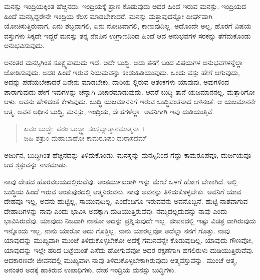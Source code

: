 ಮನಸ್ಸು ಇಂದ್ರಿಯಕ್ಕಿಂತ ಹೆಚ್ಚಿನದು. ಇಂದ್ರಿಯಕ್ಕೆ ಪ್ರಾಣ ಕೊಡುವುದು ಅದರ ಹಿಂದೆ ಇರುವ ಮನಸ್ಸು. ಇಂದ್ರಿಯದ ಹಿಂದೆ ಮನಸ್ಸಿದ್ದರೇನೇ ಇಂದ್ರಿಯ ಕೆಲಸ ಮಾಡಬೇಕಾದರೆ. ಮನಸ್ಸು ಮತ್ತಾವುದನ್ನೋ ದೀರ್ಘವಾಗಿ ಯೋಚಿಸುತ್ತಿರುವಾಗ, ಏನು ಶಬ್ದವಾಗಲಿ, ಏನು ನೋಟವಾಗಲಿ, ಕಾಣುವುದಿಲ್ಲ. ಅದೊಂದೇ ಅಲ್ಲ. ಹೊರಗೆ ವಿಷಯ ವಸ್ತುಗಳು ಸಿಕ್ಕದೇ ಇದ್ದರೆ ಮನಸ್ಸು ತನ್ನ ನೆನಪಿನ ಉಗ್ರಾಣದಿಂದ ಹಿಂದೆ ಆದ ಅನುಭವಗಳ ಸರಕನ್ನು ತೆಗೆದುಕೊಂಡು ಅನುಭವಿಸುವುದು.

ಅನಂತರ ಮನಸ್ಸಿಗಿಂತ ಸೂಕ್ಷ್ಮವಾದುದು ಇದೆ. ಅದೇ ಬುದ್ಧಿ. ಅದು ತನಗೆ ಬಂದ ವಿಷಯಗಳ ಅನುಭವಗಳನ್ನೆಲ್ಲಾ ಜೋಡಿಸುವುದು. ಅದರ ಹಿಂದೆ ಇರುವ ನಿಯಮವನ್ನು ಕಂಡುಹಿಡಿಯುವುದು. ಒಂದು ವಸ್ತು ಹೇಗೆ ಆಗುವುದು, ಅದನ್ನು ಪಡೆಯಬೇಕಾದರೆ ಏನೇನು ಮಾಡಬೇಕು, ದಾರಿಯ ಲ್ಲಿರುವ ಆತಂಕಗಳು ಯಾವುವು, ಅವುಗಳಿಂದ ಪಾರಾಗುವುದು ಹೇಗೆ ಇವುಗಳನ್ನು ಚೆನ್ನಾಗಿ ವಿಚಾರಮಾಡುವುದು. ಆದರೆ ಬುದ್ಧಿ ತಾನೆ ಯಜಮಾನನಲ್ಲ. ಮತ್ತಾರಿಗೋ ಆಳು. ಅವನು ಹೇಳಿದಂತೆ ಕೇಳುವುದು. ಬುದ್ಧಿ ಯಜಮಾನನಿಗೆ ಇರುವ ಬುದ್ಧಿವಂತನಾದ ಆಳಿನಂತೆ. ಆ ಯಜಮಾನನೇ ಆತ್ಮ. ಅವನ ಅಧೀನ ಬುದ್ಧಿ, ಮನಸ್ಸು, ಇಂದ್ರಿಯ, ದೇಹಗಳೆಲ್ಲಾ. ಅವನಿಗಾಗಿ ಇವು ದುಡಿಯುತ್ತಿವೆ.

\begin{verse}
ಏವಂ ಬುದ್ಧೇಃ ಪರಂ ಬುದ್ಧ್ವಾ ಸಂಸ್ತಭ್ಯಾತ್ಮಾನಮಾತ್ಮನಾ~।\\ಜಹಿ ಶತ್ರುಂ ಮಹಾಬಾಹೋ ಕಾಮರೂಪಂ ದುರಾಸದಮ್ 
\end{verse}

{\small ಅರ್ಜುನ, ಬುದ್ಧಿಗಿಂತ ಹೆಚ್ಚಿನದನ್ನು ತಿಳಿದುಕೊಂಡು, ಮನಸ್ಸನ್ನು ಮನಸ್ಸಿನಿಂದ ಗೆದ್ದು ಕಾಮರೂಪವೂ, ದುರ್ಜಯವೂ ಆದ ಶತ್ರುವನ್ನು ನಾಶಮಾಡು.}

ನಾವು ದೇಹದ ಹೊರವಲಯದಲ್ಲಿರುವೆವು. ಅಂತರ್ಮುಖರಾಗಿ ಇನ್ನು ಮೇಲೆ ಒಳಗೆ ಹೋಗ ಬೇಕಾಗಿದೆ. ಅಲ್ಲಿ ಬುದ್ಧಿಯ ಹಿಂದೆ ಇರುವ ಅಂತಃಪುರದಲ್ಲಿ ಆತ್ಮನಿರುವನು. ನಾವು ಅವನನ್ನು ತಿಳಿದುಕೊಳ್ಳಬೇಕು. ಅವನಿಗೆ ಯಾವ ದೇಹವೂ ಇಲ್ಲ, ಅವನು ಹುಟ್ಟಿಲ್ಲ, ಸಾಯುವುದಿಲ್ಲ. ಎಂದೆಂದಿಗೂ ಇರುವವನು ಅವನೊಬ್ಬನೆ. ಹುಟ್ಟಿ ನಾಶವಾಗುವ ದೇಹಾದಿಗಳನ್ನು ನಾವು ಎಂದು ಭಾವಿಸಿ ಅದಕ್ಕಾಗಿ ದುಡಿಯುತ್ತಿರುವೆವು. ನಮ್ಮದಲ್ಲದುದನ್ನು ನಾವು ಎಂದು ಭಾವಿಸಿರುವೆವು. ಯಾವುದು ನಿಜವಾಗಿ ನಾನೋ ಅದನ್ನು ಪ್ರಶ್ನಿಸುವುದೇ ಇಲ್ಲ. ಜೀವನದಲ್ಲಿ ಇಷ್ಟು ವಿಚಿತ್ರ ವಾಗಿರುವುದು ಇನ್ನೊಂದು ಇಲ್ಲ. ನಾನು ಯಾರೋ ಅದು ಗೊತ್ತಿಲ್ಲ. ನಾನು ಯಾರಲ್ಲವೋ ಅದೆಲ್ಲಾ ನನಗೆ ಗೊತ್ತು. ನಾವು ಯಾವುದನ್ನು ಮುಖ್ಯವಾಗಿ ಮುಂಚೆ ತಿಳಿದುಕೊಳ್ಳಬೇಕೋ ಅದಕ್ಕೆ ಗಮನವನ್ನೇ ಕೊಡುವುದಿಲ್ಲ. ಯಾವುದು ಗೌಣವೋ, ಯಾವುದನ್ನು ಇಲ್ಲೇ ಹರಿದ ಬಟ್ಟೆಯಂತೆ ಎಸೆದು ಹೋಗುವೆವೋ ಅದರ ರಕ್ಷಣೆಗಾಗಿ ಹಗಲಿರುಳು ದುಡಿಯುತ್ತಿರುವೆವು. ಆದಕಾರಣವೇ ಜೀವನದಲ್ಲಿ ಮುಖ್ಯವಾಗಿ ನಾವು ತಿಳಿದುಕೊಳ್ಳಬೇಕಾಗಿರುವುದು ಆತ್ಮವಸ್ತುವನ್ನು. ಮುಂಚೆ ಆತ್ಮ, ಅನಂತರ ಅದಕ್ಕೆ ಹಾಕಿರುವ ಉಪಾಧಿಗಳು, ದೇಹ ಇಂದ್ರಿಯ ಮನಸ್ಸು ಬುದ್ಧಿಗಳು.

